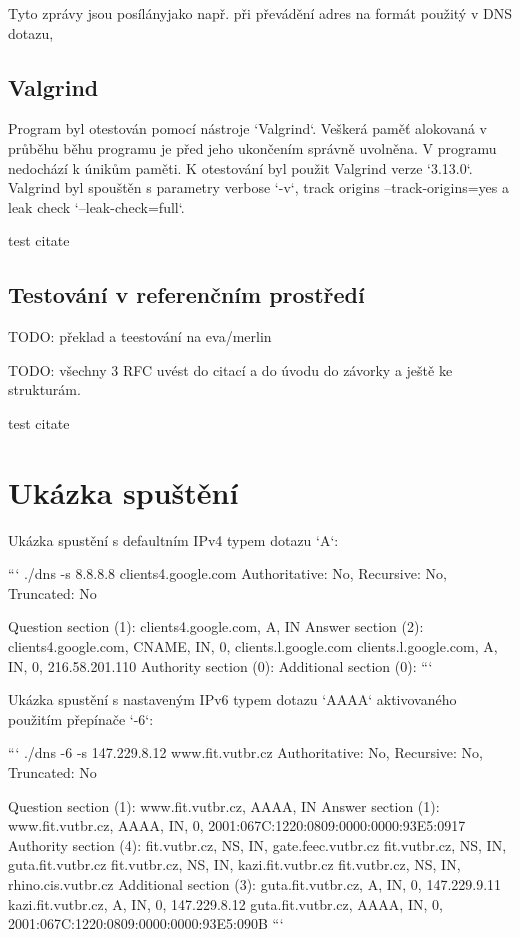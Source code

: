 \documentclass[a4paper,11pt]{article}
\begin{document}
Tyto zprávy jsou posílányjako např. při převádění adres na formát použitý v DNS dotazu, 

\subsection{Valgrind}

Program byl otestován pomocí nástroje `Valgrind`. Veškerá paměť alokovaná v průběhu běhu programu je před jeho ukončením správně uvolněna. V programu nedochází k únikům paměti. K otestování byl použit Valgrind verze `3.13.0`. Valgrind byl spouštěn s parametry verbose `-v`, track origins --track-origins=yes a leak check `--leak-check=full`.

test citate \cite{test_citate}

\subsection{Testování v referenčním prostředí}

TODO: překlad a teestování na eva/merlin

TODO: všechny 3 RFC uvést do citací a do úvodu do závorky a ještě ke strukturám.

test citate \cite{test_citate}

\section{Ukázka spuštění}

Ukázka spustění s defaultním IPv4 typem dotazu `A`:

```
./dns -s 8.8.8.8 clients4.google.com
Authoritative: No, Recursive: No, Truncated: No

Question section (1):
  clients4.google.com, A, IN
Answer section (2):
  clients4.google.com, CNAME, IN, 0, clients.l.google.com
  clients.l.google.com, A, IN, 0, 216.58.201.110
Authority section (0):
Additional section (0):
```

Ukázka spustění s nastaveným IPv6 typem dotazu `AAAA` aktivovaného použitím přepínače `-6`:

```
./dns -6 -s 147.229.8.12 www.fit.vutbr.cz
Authoritative: No, Recursive: No, Truncated: No

Question section (1):
  www.fit.vutbr.cz, AAAA, IN
Answer section (1):
  www.fit.vutbr.cz, AAAA, IN, 0, 2001:067C:1220:0809:0000:0000:93E5:0917
Authority section (4):
  fit.vutbr.cz, NS, IN, gate.feec.vutbr.cz
  fit.vutbr.cz, NS, IN, guta.fit.vutbr.cz
  fit.vutbr.cz, NS, IN, kazi.fit.vutbr.cz
  fit.vutbr.cz, NS, IN, rhino.cis.vutbr.cz
Additional section (3):
  guta.fit.vutbr.cz, A, IN, 0, 147.229.9.11
  kazi.fit.vutbr.cz, A, IN, 0, 147.229.8.12
  guta.fit.vutbr.cz, AAAA, IN, 0, 2001:067C:1220:0809:0000:0000:93E5:090B
```
\end{document}
